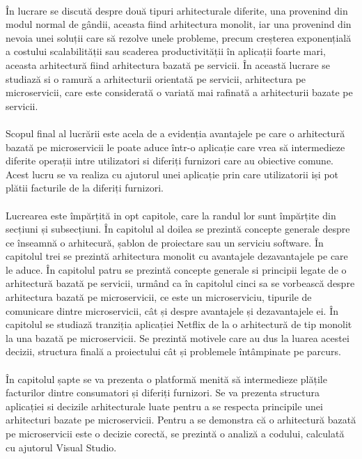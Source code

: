 \documentclass[12pt]{report}
\begin{document}
	\paragraph{}În lucrare se discută despre două tipuri arhitecturale diferite, una provenind din modul normal de gândii, aceasta fiind arhitectura monolit, iar una provenind din nevoia unei soluții care să rezolve unele probleme, precum creșterea exponențială a costului scalabilității sau scaderea productivității în aplicații foarte mari, aceasta arhitectură fiind arhitectura bazată pe servicii. În această lucrare se studiază si o ramură a arhitecturii orientată pe servicii, arhitectura pe microservicii, care este considerată o variată mai rafinată a arhitecturii bazate pe servicii.
	\paragraph{}Scopul final al lucrării este acela de a evidenția avantajele pe care o arhitectură bazată pe microservicii le poate aduce într-o aplicație care vrea să intermedieze diferite operații intre utilizatori si diferiți furnizori care au obiective comune. Acest lucru se va realiza cu ajutorul unei aplicație prin care utilizatorii iși pot plătii facturile de la diferiți furnizori.
	\paragraph{}Lucrearea este împărțită in opt capitole, care la randul lor sunt împărțite din secțiuni și subsecțiuni. În capitolul al doilea se prezintă concepte generale despre ce înseamnă o arhitecură, șablon de proiectare sau un serviciu software. În capitolul trei se prezintă arhitectura monolit cu avantajele dezavantajele pe care le aduce. În capitolul patru se prezintă concepte generale si principii legate de o arhitectură bazată pe servicii, urmând ca în capitolul cinci sa se vorbească despre arhitectura bazată pe microservicii, ce este un microserviciu, tipurile de comunicare dintre microservicii, cât și despre avantajele și dezavantajele ei. În capitolul se studiază tranziția aplicației Netflix de la o arhitectură de tip monolit la una bazată pe microservicii. Se prezintă motivele care au dus la luarea acestei decizii, structura finală a proiectului cât și problemele întâmpinate pe parcurs.
	\paragraph{}În capitolul șapte se va prezenta o platformă menită să intermedieze plățile facturilor dintre consumatori și diferiți furnizori. Se va prezenta structura aplicației si decizile arhitecturale luate pentru a se respecta principile unei arhitecturi bazate pe microservicii. Pentru a se demonstra că o arhitectură bazată pe microservicii este o decizie corectă, se prezintă o analiză a codului, calculată cu ajutorul Visual Studio.
\end{document}
